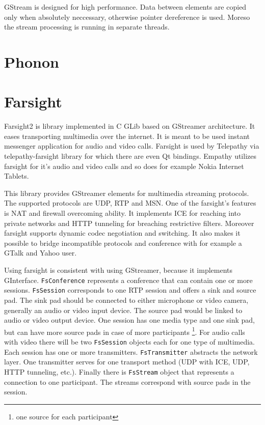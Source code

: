 GStream is designed for high performance. Data between elements are copied only when absolutely neccessary, otherwise pointer dereference is used. Moreso the stream processing is running in separate threads.  

\section{Phonon}
\section{Farsight}
Farsight2 \cite{farsight} is library implemented in C GLib based on GStreamer architecture. It eases transporting multimedia over the internet. It is meant to be used instant messenger application for audio and video calls. Farsight is used by Telepathy via telepathy-farsight library for which there are even Qt bindings. Empathy utilizes farsight for it's audio and video calls and so does for example Nokia Internet Tablets.

This library provides GStreamer elements for multimedia streaming protocols. The supported protocols are UDP, RTP and MSN. One of the farsight's features is NAT and firewall overcoming ability. It implements ICE for reaching into private networks and HTTP tunneling for breaching restrictive filters. Moreover farsight supports dynamic codec negotiation and switching. It also makes it possible to bridge incompatible protocols and conference with for example a GTalk and Yahoo user. 

Using farsight is consistent with using GStreamer, because it implements GInterface. \verb|FsConference| represents a conference that can contain one or more sessions. \verb|FsSession| corresponds to one RTP session and offers a sink and source pad. The sink pad should be connected to either microphone or video camera, generally an audio or video input device. The source pad would be linked to audio or video output device. One session has one media type and one sink pad, but can have more source pads in case of more participants \footnote{one source for each participant}. For audio calls with video there will be two \verb|FsSession| objects each for one type of multimedia. Each session has one or more transmitters. \verb|FsTransmitter| abstracts the network layer. One transmitter serves for one transport method (UDP with ICE, UDP, HTTP tunneling, etc.). Finally there is \verb|FsStream| object that represents a connection to one participant. The streams correspond with source pads in the session.

